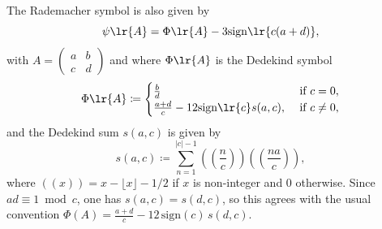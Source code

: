 \documentclass[a4paper, aps, pra, 11pt, onecolumn, tightenlines, superscriptaddress]{revtex4-2}
\begin{document}
The Rademacher symbol is also given by \cite{Duke}
\begin{equation}
\psi\lr{A}=\Phi\lr{A}-3\mathrm{sign} \lr{c(a+d)}, 
\end{equation}
with $A=\begin{pmatrix}
a & b \\ c & d
\end{pmatrix} $
and where $\Phi\lr{A}$ is the Dedekind symbol 
\begin{align}
\Phi\lr{A}\coloneqq\begin{cases} \frac{b}{d} & \text{ if } c=0, \\
\frac{a+d}{c}-12\mathrm{sign}\lr{c} s(a,c), & \text{ if } c\neq 0,
\end{cases}
\end{align}
and the Dedekind sum $s(a,c)$ is given by
\begin{equation}
s(a,c)\coloneqq\sum_{n=1}^{|c|-1} \left(\!\left(\frac{n}{c}\right)\!\right)\left(\!\left(\frac{na}{c}\right)\!\right),
\end{equation}
where $\left(\!\left(x\right)\!\right)=x-\lfloor x \rfloor -1/2$ if $x$ is non-integer and $0$ otherwise. Since $ad\equiv 1 \bmod c$, one has $s(a,c)=s(d,c)$, so this agrees with the usual convention $\Phi(A)=\frac{a+d}{c}-12\,\mathrm{sign}(c)\,s(d,c)$.
\end{document}
